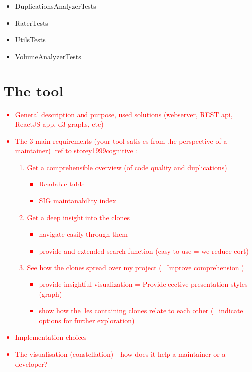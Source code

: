 \documentclass{uva-inf-article}
\newcommand\todo[1]{\textcolor{red}{#1}}
\begin{document}
\begin{itemize}

\item
  DuplicationsAnalyzerTests
\item
  RaterTests
\item
  UtilsTests
\item
  VolumeAnalyzerTests
\end{itemize}


\section{The tool}
\todo{
\begin{itemize}
\item{General description and purpose, used solutions (webserver, REST api, ReactJS app, d3 graphs, etc)}
\item{The 3 main requirements (your tool satises from the perspective of a maintainer) [ref to storey1999cognitive]:
  \begin{enumerate}
    \item{Get a comprehensible overview (of code quality and duplications) 
      \begin{itemize}
        \item{Readable table}
        \item{SIG maintanability index}
      \end{itemize}
      }
    \item{Get a deep insight into the clones 
      \begin{itemize}
        \item{navigate easily through them}
        \item{provide and extended search function (easy to use = we reduce eort)}
      \end{itemize}
     }
    \item{See how the clones spread over my project (=Improve comprehension ) 
      \begin{itemize}
        \item{provide insightful visualization = Provide eective presentation styles (graph)}
        \item{show how the les containing clones relate to each other (=indicate options for further exploration)}
      \end{itemize}
      }
  \end{enumerate}
}
\item{Implementation choices}
\item{The visualisation (constellation) - how does it help a maintainer or a developer?}
\end{itemize}
}
\end{document}

